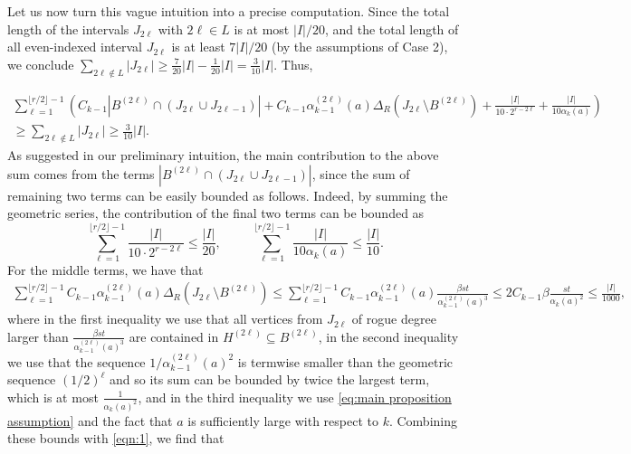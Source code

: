\documentclass[a4paper,11pt]{article}
\makeatletter
\renewenvironment{proof}[1][\proofname] {\par\pushQED{\qed}\normalfont\topsep6\p@\@plus6\p@\relax\trivlist\item[\hskip\labelsep\bfseries#1\@addpunct{.}]\ignorespaces}{\popQED\endtrivlist\@endpefalse}
\theoremstyle{definition}
\makeatother
\begin{document}
\begin{proof}
\begin{proof}
Let us now turn this vague intuition into a precise computation. Since the total length of the intervals $J_{2\ell}$ with $2\ell\in L$ is at most $|I|/20$, and the total length of all even-indexed interval $J_{2\ell}$ is at least $7|I|/20$ (by the assumptions of Case 2), we conclude $\sum_{ 2\ell\notin L} |J_{2\ell}|\geq \frac{7}{20}|I| -  \frac{1}{20} |I| = \frac{3}{10}|I|$. Thus,

\begin{multline}\label{eqn:1}
\sum_{\ell=1}^{\lfloor r/2\rfloor -1}  \left(C_{k-1}|B^{(2\ell)}\cap (J_{2\ell}\cup J_{2\ell-1})| +C_{k-1} \alpha_{k-1}^{(2\ell)}(a)\Delta_R(J_{2\ell} \setminus B^{(2\ell)})+\frac{|I|}{10\cdot 2^{r-2\ell}}+\frac{|I|}{10\alpha_k(a)}\right)\\
\geq \sum_{ 2\ell\notin L} |J_{2\ell}|\geq \frac{3}{10}|I|. 
\end{multline}
As suggested in our preliminary intuition, the main contribution to the above sum comes from the terms $|B^{(2\ell)}\cap (J_{2\ell}\cup J_{2\ell-1})|$, since the sum of remaining two terms can be easily bounded as follows. Indeed, by summing the geometric series, the contribution of the final two terms can be bounded as
\[
\sum_{\ell= 1}^{\lfloor r/2\rfloor-1} \frac{|I|}{ 10\cdot 2^{r-2\ell}}\leq \frac{|I|}{20}, \hspace{1cm}\sum_{\ell= 1}^{\lfloor r/2\rfloor-1} \frac{|I|}{ 10\alpha_k(a)}\leq \frac{|I|}{10}.
\]
For the middle terms, we have that
\begin{align*}
\sum_{\ell= 1}^{\lfloor r/2\rfloor-1} C_{k-1} \alpha_{k-1}^{(2\ell)}(a) \Delta_R(J_{2\ell} \setminus B^{(2\ell)}) \leq \sum_{\ell= 1 }^{\lfloor r/2\rfloor-1} C_{k-1} \alpha_{k-1}^{(2\ell)}(a) \frac{\beta st}{\alpha_{k-1}^{(2\ell)}(a)^3} \leq 2C_{k-1}\beta \frac{st}{\alpha_{k}(a)^2}\leq \frac{|I|}{1000},
\end{align*}
where in the first inequality we use that all vertices from $J_{2\ell}$ of rogue degree larger than $\frac{\beta st}{\alpha_{k-1}^{(2\ell)}(a)^3}$ are contained in $H^{(2\ell)}\subseteq B^{(2\ell)}$, in the second inequality we  use that the sequence ${1}/{\alpha_{k-1}^{(2\ell)}(a)^2}$ is termwise smaller than the geometric sequence $(1/2)^{\ell}$ and so its sum can be bounded by twice the largest term, which is at most $\frac{1}{\alpha_k(a)^2}$, and in the third inequality we use \eqref{eq:main proposition assumption} and the fact that $a$ is sufficiently large with respect to $k$.
Combining these bounds with \eqref{eqn:1}, we find that 
\begin{align}\label{eqn:2}

\end{align}
\end{proof}
\end{proof}
\end{document}
